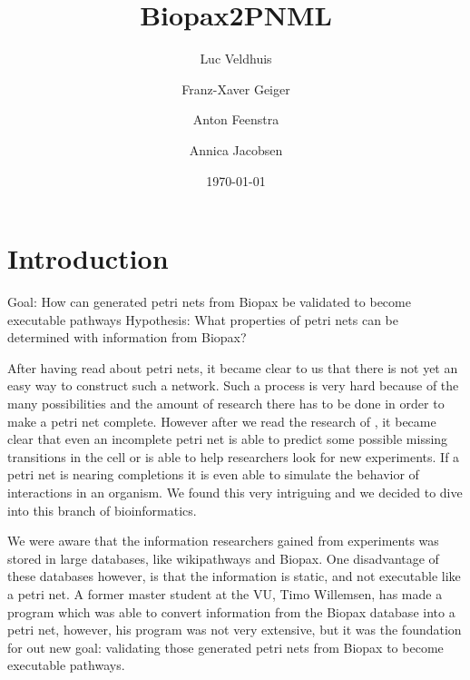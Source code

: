 \documentclass[12pt,a4paper,draft]{article}
\author{Luc Veldhuis \and Franz-Xaver Geiger \and Anton Feenstra \and Annica Jacobsen}
\title{Biopax2PNML}
\date{\today}
\begin{document}
    \maketitle
    \listoftodos
    
    \pagebreak
    
\section{Introduction}\label{sec:introduction}


    Goal:     
    How can generated petri nets from Biopax be validated to become executable pathways
    Hypothesis:
    What properties of petri nets can be determined with information from Biopax?
     
    
    After having read about petri nets\cite{Boldhaus2010, Krepska2008, Bonzanni2009}, it became clear to us that there is not yet an easy way to construct such a network. Such a process is very hard because of the many possibilities and the amount of research there has to be done in order to make a petri net complete. However after we read the research of \cite{Bonzanni2013}, it became clear that even an incomplete petri net is able to predict some possible missing transitions in the cell or is able to help researchers look for new experiments.
    \cite{Bonzanni2009}
    If a petri net is nearing completions it is even able to simulate the behavior of interactions in an organism. We found this very intriguing and we decided to dive into this branch of bioinformatics.
    
    We were aware that the information researchers gained from experiments was stored in large databases, like wikipathways and Biopax. \cite{Willemsen2013} One disadvantage of these databases however, is that the information is static, and not executable like a petri net. A former master student at the VU, Timo Willemsen, has made a program which was able to convert information from the Biopax database into a petri net, however, his program was not very extensive, but it was the foundation for out new goal: validating those generated petri nets from Biopax to become executable pathways.
    
\end{document}
